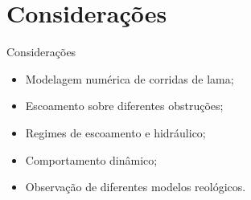 \section{Considerações}

\begin{frame}
    \begin{exampleblock}{Considerações}
        \begin{itemize}
            \item Modelagem numérica de corridas de lama;
            \item Escoamento sobre diferentes obstruções;
            \item Regimes de escoamento e hidráulico;
            \item Comportamento dinâmico;
            \item Observação de diferentes modelos reológicos.
        \end{itemize}        
    \end{exampleblock}
\end{frame}

